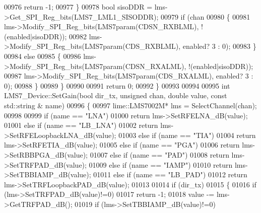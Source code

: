 \begin{DoxyCode}
{{{00976                 \textcolor{keywordflow}{return} -1;
00977         \}
00978         \textcolor{keywordtype}{bool} sisoDDR = lms->Get_SPI_Reg_bits(LMS7_LML1_SISODDR);
00979         \textcolor{keywordflow}{if} (chan%
00980         \{
00981             lms->Modify_SPI_Reg_bits(LMS7param(CDSN_RXBLML), !(enabled|sisoDDR));
00982             lms->Modify_SPI_Reg_bits(LMS7param(CDS_RXBLML), enabled? 3 : 0);
00983         \}
00984         \textcolor{keywordflow}{else}
00985         \{
00986             lms->Modify_SPI_Reg_bits(LMS7param(CDSN_RXALML), !(enabled|sisoDDR));
00987             lms->Modify_SPI_Reg_bits(LMS7param(CDS_RXALML),  enabled? 3 : 0);
00988         \}
00989     \}
00990 
00991    \textcolor{keywordflow}{return} 0;
00992 \}
00993 
00994 
00995 \textcolor{keywordtype}{int} LMS7_Device::SetGain(\textcolor{keywordtype}{bool} dir_tx, \textcolor{keywordtype}{unsigned} chan, \textcolor{keywordtype}{double} value, \textcolor{keyword}{const} std::string &
      name)
00996 \{
00997     lime::LMS7002M* lms = SelectChannel(chan);
00998 
00999     \textcolor{keywordflow}{if} (name == \textcolor{stringliteral}{"LNA"})
01000         \textcolor{keywordflow}{return} lms->SetRFELNA_dB(value);
01001     \textcolor{keywordflow}{else} \textcolor{keywordflow}{if} (name == \textcolor{stringliteral}{"LB\_LNA"})
01002         \textcolor{keywordflow}{return} lms->SetRFELoopbackLNA_dB(value);
01003     \textcolor{keywordflow}{else} \textcolor{keywordflow}{if} (name == \textcolor{stringliteral}{"TIA"})
01004         \textcolor{keywordflow}{return} lms->SetRFETIA_dB(value);
01005     \textcolor{keywordflow}{else} \textcolor{keywordflow}{if} (name == \textcolor{stringliteral}{"PGA"})
01006         \textcolor{keywordflow}{return} lms->SetRBBPGA_dB(value);
01007     \textcolor{keywordflow}{else} \textcolor{keywordflow}{if} (name == \textcolor{stringliteral}{"PAD"})
01008         \textcolor{keywordflow}{return} lms->SetTRFPAD_dB(value);
01009     \textcolor{keywordflow}{else} \textcolor{keywordflow}{if} (name == \textcolor{stringliteral}{"IAMP"})
01010         \textcolor{keywordflow}{return} lms->SetTBBIAMP_dB(value);
01011     \textcolor{keywordflow}{else} \textcolor{keywordflow}{if} (name == \textcolor{stringliteral}{"LB\_PAD"})
01012         \textcolor{keywordflow}{return} lms->SetTRFLoopbackPAD_dB(value);
01013 
01014     \textcolor{keywordflow}{if} (dir\_tx)
01015     \{
01016         \textcolor{keywordflow}{if} (lms->SetTRFPAD_dB(value)!=0)
01017             \textcolor{keywordflow}{return} -1;
01018         value -= lms->GetTRFPAD_dB();
01019         \textcolor{keywordflow}{if} (lms->SetTBBIAMP_dB(value)!=0)
}}}
\end{DoxyCode}

